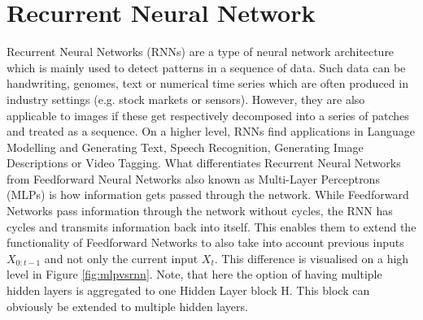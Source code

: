 \section{Recurrent Neural Network}
Recurrent Neural Networks (RNNs) are a type of neural network architecture which is mainly used
to detect patterns in a sequence of data. Such data can be handwriting, genomes, text or numerical
time series which are often produced in industry settings (e.g. stock markets or sensors).
However, they are also applicable to images if these get respectively decomposed into a series of
patches and treated as a sequence. On a higher level, RNNs find applications in Language
Modelling and Generating Text, Speech Recognition, Generating Image Descriptions or Video Tagging.
What differentiates Recurrent Neural Networks from Feedforward Neural Networks also known
as Multi-Layer Perceptrons (MLPs) is how information gets passed through the network. While
Feedforward Networks pass information through the network without cycles, the RNN has cycles and
transmits information back into itself. This enables them to extend the functionality of Feedforward
Networks to also take into account previous inputs $X_{0:t-1}$ and not only the current input $X_t$. This
difference is visualised on a high level in Figure \ref{fig:mlpvsrnn}. Note, that here the option of having multiple
hidden layers is aggregated to one Hidden Layer block H. This block can obviously be extended to
multiple hidden layers.

